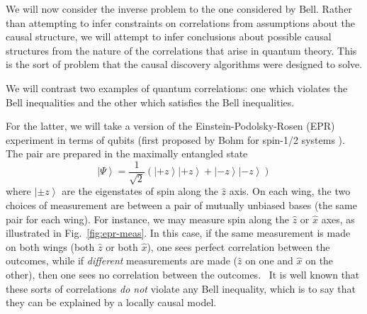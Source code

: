 \documentclass[12pt,onecolumn,nofootinbib]{revtex4-2}
\begin{document}
We will now consider the inverse problem to the one considered by
Bell. Rather than attempting to infer constraints on correlations from
assumptions about the causal structure, we will attempt to infer conclusions
about possible causal structures from the nature of the correlations that arise in quantum theory. This is the sort of problem that the causal discovery
algorithms were designed to solve.

We will contrast two examples of quantum correlations: one which violates
the Bell inequalities and the other which satisfies the Bell inequalities.

For the latter, we will take a version of the Einstein-Podolsky-Rosen (EPR)
experiment \cite{Einstein1935} in terms of qubits (first proposed by Bohm for spin-1/2 systems \cite{Bohmtextbook}).
The pair are prepared in the maximally entangled state
\begin{equation}
\left\vert \Psi \right\rangle =\frac{1}{\sqrt{2}}\left( \left\vert +z\right\rangle \left\vert
+z\right\rangle +\left\vert -z\right\rangle \left\vert -z\right\rangle
\right)
\label{eqn:maxent}
\end{equation}
where $\left\vert \pm z\right\rangle $ are the eigenstates of
spin along the $\hat{z}$ axis. On each wing, the two choices of measurement
are between a pair of mutually unbiased bases (the same pair for each wing).  For instance, we may measure spin along the $\hat{z}$ or $\hat{x}$ axes, as illustrated
in Fig.~\ref{fig:epr-meas}. In this case, if the same measurement is made on both wings
(both $\hat{z}$ or both $\hat{x}$), one sees perfect correlation between the
outcomes, while if \emph{different }measurements are made ($\hat{z}$ on one
and $\hat{x}$ on the other), then one sees no correlation between the
outcomes.   \ It is well known that these sorts of correlations \emph{do not
}violate any Bell inequality, which is to say that they can be explained by
a locally causal model.
\end{document}
